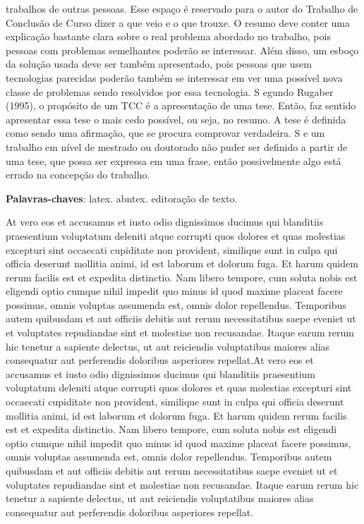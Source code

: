 \documentclass[
	12pt,				%
    oneside,			%
	a4paper,			%
	english,			%
	french,				%
	spanish,			%
	brazil,				%
	]{abntex2}
\begin{document}
\begin{resumo}
 trabalhos de outras pessoas. Esse espaço é reservado para o autor do Trabalho de Conclusão de Curso dizer a que veio e o que
 trouxe.
 O resumo deve conter uma explicação bastante clara sobre o real problema abordado no trabalho, pois
 pessoas com problemas semelhantes poderão se interessar. Além disso, um esboço da solução usada deve ser
 também apresentado, pois pessoas que usem tecnologias parecidas poderão também se interessar em ver uma
 possível nova classe de problemas sendo resolvidos por essa tecnologia.
 S egundo Rugaber (1995), o propósito de um TCC é a apresentação de uma tese. Então, faz sentido
 apresentar essa tese o mais cedo possível, ou seja, no resumo. A tese é definida como sendo uma afirmação,
 que se procura comprovar verdadeira. S e um trabalho em nível de mestrado ou doutorado não puder ser
 definido a partir de uma tese, que possa ser expressa em uma frase, então possivelmente algo está errado na
 concepção do trabalho.

 \vspace{\onelineskip}
    
 \noindent
 \textbf{Palavras-chaves}: latex. abntex. editoração de texto.
\end{resumo} %


\begin{resumo}[Abstract]
	At vero eos et accusamus et iusto odio dignissimos ducimus qui blanditiis praesentium voluptatum deleniti atque corrupti quos dolores et quas molestias excepturi sint occaecati cupiditate non provident, similique sunt in culpa qui officia deserunt mollitia animi, id est laborum et dolorum fuga. Et harum quidem rerum facilis est et expedita distinctio. Nam libero tempore, cum soluta nobis est eligendi optio cumque nihil impedit quo minus id quod maxime placeat facere possimus, omnis voluptas assumenda est, omnis dolor repellendus. Temporibus autem quibusdam et aut officiis debitis aut rerum necessitatibus saepe eveniet ut et voluptates repudiandae sint et molestiae non recusandae. Itaque earum rerum hic tenetur a sapiente delectus, ut aut reiciendis voluptatibus maiores alias consequatur aut perferendis doloribus asperiores repellat.At vero eos et accusamus et iusto odio dignissimos ducimus qui blanditiis praesentium voluptatum deleniti atque corrupti quos dolores et quas molestias excepturi sint occaecati cupiditate non provident, similique sunt in culpa qui officia deserunt mollitia animi, id est laborum et dolorum fuga. Et harum quidem rerum facilis est et expedita distinctio. Nam libero tempore, cum soluta nobis est eligendi optio cumque nihil impedit quo minus id quod maxime placeat facere possimus, omnis voluptas assumenda est, omnis dolor repellendus. Temporibus autem quibusdam et aut officiis debitis aut rerum necessitatibus saepe eveniet ut et voluptates repudiandae sint et molestiae non recusandae. Itaque earum rerum hic tenetur a sapiente delectus, ut aut reiciendis voluptatibus maiores alias consequatur aut perferendis doloribus asperiores repellat.
\end{resumo}
\end{document}
